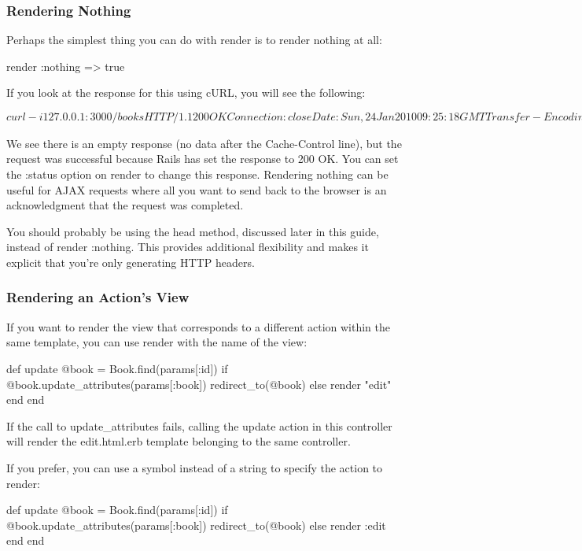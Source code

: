 \documentclass[10pt]{book}
\newenvironment{code}{%
  \scriptsize
    \verbatim
}{%
    \endverbatim
    \newline
}
\begin{document}
\subsubsection{ Rendering Nothing}

Perhaps the simplest thing you can do with render is to render nothing at all:
\begin{code}
render :nothing => true
\end{code}

If you look at the response for this using cURL, you will see the following:
\begin{code}
$ curl -i 127.0.0.1:3000/books
HTTP/1.1 200 OK
Connection: close
Date: Sun, 24 Jan 2010 09:25:18 GMT
Transfer-Encoding: chunked
Content-Type: */*; charset=utf-8
X-Runtime: 0.014297
Set-Cookie: _blog_session=...snip...; path=/; HttpOnly
Cache-Control: no-cache
 
$
\end{code}

We see there is an empty response (no data after the Cache-Control line), but the request was successful because Rails has set the response to 200 OK. You can set the :status option on render to change this response. Rendering nothing can be useful for AJAX requests where all you want to send back to the browser is an acknowledgment that the request was completed.

You should probably be using the head method, discussed later in this guide, instead of render :nothing. This provides additional flexibility and makes it explicit that you’re only generating HTTP headers.

\subsubsection{ Rendering an Action’s View}

If you want to render the view that corresponds to a different action within the same template, you can use render with the name of the view:
\begin{code}
def update
  @book = Book.find(params[:id])
  if @book.update_attributes(params[:book])
    redirect_to(@book)
  else
    render "edit"
  end
end
\end{code}

If the call to update\_attributes fails, calling the update action in this controller will render the edit.html.erb template belonging to the same controller.

If you prefer, you can use a symbol instead of a string to specify the action to render:
\begin{code}
def update
  @book = Book.find(params[:id])
  if @book.update_attributes(params[:book])
    redirect_to(@book)
  else
    render :edit
  end
end
\end{code}
\end{document}
